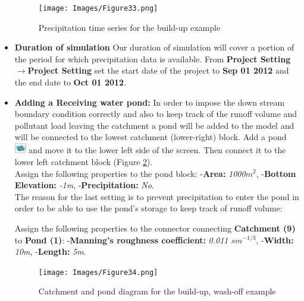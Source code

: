 \begin{itemize}
\begin{figure}[!ht]
\begin{center}
\texttt{[image: Images/Figure33.png]} \\
\caption{Precipitation time series for the build-up example}\label{fig:33} 
\end{center}
\end{figure}
   \item \textbf{Duration of simulation} Our duration of simulation will cover a portion of the period for which precipitation data is available. From \textbf{Project Setting}$\rightarrow$\textbf{Project Setting} set the start date of the project to \textbf{Sep 01 2012} and the end date to \textbf{Oct 01 2012}. 
   \item \textbf{Adding a Receiving water pond: } In order to impose the down stream boundary condition correctly and also to keep track of the runoff volume and pollutant load leaving the catchment a pond will be added to the model and will be connected to the lowest catchment (lower-right) block. Add a pond \includegraphics[width=0.5cm]{Icons/pond_icon.png} and move it to the lower left side of the screen. Then connect it to the lower left catchment block (Figure \ref{fig:34}).\\
   
   Assign the following properties to the pond block: -\textbf{Area: } \textit{1000$m^2$}, -\textbf{Bottom Elevation: }  \textit{-1m}, -\textbf{Precipitation: } \textit{No}. \\
   
   The reason for the last setting is to prevent precipitation to enter the pond in order to be able to use the pond's storage to keep track of runoff volume:
   
   Assign the following properties to the connector connecting \textbf{Catchment (9)} to \textbf{Pond (1)}: -\textbf{Manning's roughness coefficient: } \textit{0.011 $s  m^{-1/3}$}, -\textbf{Width: } \textit{10m}, -\textbf{Length: } \textit{5m}.  
   
\begin{figure}[!ht]
\begin{center}
\texttt{[image: Images/Figure34.png]} \\
\caption{Catchment and pond diagram for the build-up, wash-off example}\label{fig:34} 
\end{center}
\end{figure}   
   

\end{itemize}

